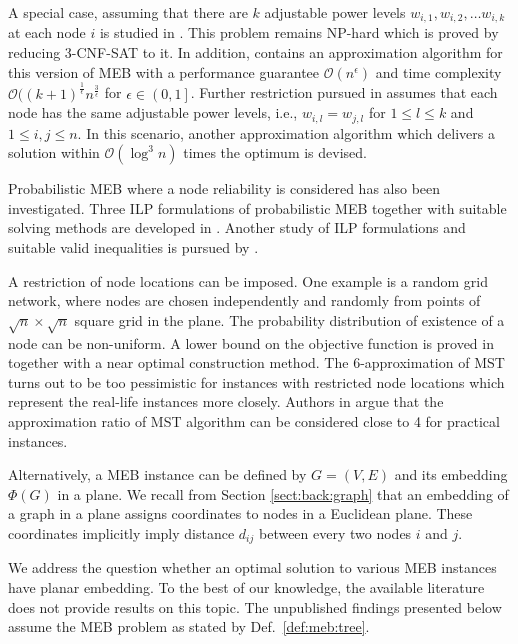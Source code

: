 A special case, assuming that there are $k$ adjustable power levels $w_{i,1},w_{i,2},\dots w_{i,k}$ at each node $i$ is studied in \cite{liang02}.
This problem remains NP-hard which is proved by reducing \textsc{3-CNF-SAT} to it.
In addition, \cite{liang02} contains an approximation algorithm for this version of MEB with a performance guarantee $\mathcal{O}(n^\epsilon)$ and 
time complexity $\mathcal{O}((k+1)^{\frac{1}{\epsilon}} n^{\frac{3}{\epsilon}}$ for $\epsilon\in \left(0,1\right]$.
Further restriction pursued in \cite{liang02} assumes that each node has the same adjustable power levels, i.e., $w_{i,l}=w_{j,l}$ for $1\leq l\leq k$ and $1\leq i,j\leq n$.
In this scenario, another approximation algorithm which delivers a solution within $\mathcal{O}(\log^3 n)$ times the optimum is devised.

Probabilistic MEB where a node reliability is considered has also been investigated.
Three ILP formulations of probabilistic MEB together with suitable solving methods are developed in \cite{montemanni08}.
Another study of ILP formulations and suitable valid inequalities is pursued by \cite{barta10}.

A restriction of node locations can be imposed.
One example is a random grid network, where nodes are chosen independently and randomly from points of $\sqrt{n}\times\sqrt{n}$ square grid in the plane.
The probability distribution of existence of a node can be non-uniform.
A lower bound on the objective function is proved in \cite{calamoneri08} together with a near optimal construction method.
The 6-approximation of MST turns out to be too pessimistic for instances with restricted node locations which represent the real-life instances more closely.
Authors in \cite{flammini07} argue that the approximation ratio of MST algorithm can be considered close to 4 for practical instances.

Alternatively, a MEB instance can be defined by $G=(V,E)$ and its embedding $\Phi(G)$ in a plane.
We recall from Section \ref{sect:back:graph} that an embedding of a graph in a plane assigns coordinates to nodes in a Euclidean plane.
These coordinates implicitly imply distance $d_{ij}$ between every two nodes $i$ and $j$.

We address the question whether an optimal solution to various MEB instances have planar embedding.
To the best of our knowledge, the available literature does not provide results on this topic.
The unpublished findings presented below assume the MEB problem as stated by Def.~\ref{def:meb:tree}.

